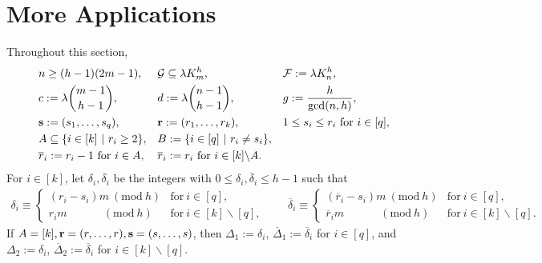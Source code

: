 \documentclass[12pt,oneside]{amsart}
\newcommand{\Mod}[1]{\ (\mathrm{mod}\ #1)}
\newcommand{\cc}{\mathcal}
\begin{document}
\section{More Applications} \label{compappli}
Throughout this section,  
\begin{align*}
    && &n \geq (h-1)(2m-1), && \cc G\subseteq \lambda K_m^h, && \cc F:= \lambda K_n^h,\\
    &&  &c:=\lambda \binom{m-1}{h-1}, && d:=\lambda \binom{n-1}{h-1},  &&g:=\dfrac{h}{\gcd(n,h)}, \\
    && &\vb{s}:=(s_1,\dots,s_q), && \vb{r}:=(r_1,\dots,r_k), && 1\leq s_i\leq r_i \mbox { for } i\in [q],\\
    && &A\subseteq \{i \in [k]\ |\ r_i\geq 2\}, && B:=\{i\in [q] \ |\ r_i\neq s_i\},\\
    && &\overline {r}_i:=r_i-1 \mbox { for }i\in A, &&\overline {r}_i:=r_i  \mbox { for } i\in [k]\backslash A.
\end{align*} 
For $i\in [k]$, let $\delta_i, \overline{\delta}_i$ be the integers with $0\leq \delta_i, \overline{\delta}_i\leq h-1$ such that 
\begin{align*}
 \delta_i \equiv \begin{cases}
   (r_i-s_i)m \Mod h
    &
    {\text{for}}\ i\in [q],
    \\
    r_i m \quad \qquad \Mod h
    &
    {\text{for}}\  i\in [k] \backslash [q],
  \end{cases} \qquad 
\overline{\delta}_i \equiv \begin{cases}
   (\overline{r}_i-s_i)m \Mod h
    &
    {\text{for}}\ i\in [q],
    \\
    \overline{r}_i m \quad \qquad \Mod h
    &
    {\text{for}}\  i\in [k] \backslash [q].
  \end{cases}\end{align*}
If $A=[k], \vb{r}=(r,\dots,r), \vb{s}=(s,\dots,s)$, then  $\Delta_1:=\delta_i$, $\overline {\Delta}_1:=\overline {\delta}_i$ for $i\in [q]$, and $\Delta_2:=\delta_i$, $\overline {\Delta}_2:=\overline {\delta}_i$ for $i\in [k] \backslash [q]$. 
\end{document}
